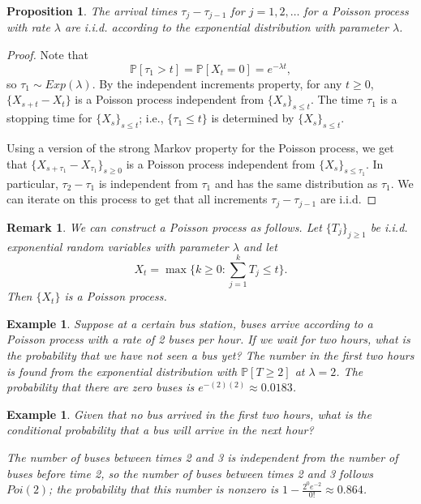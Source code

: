 \documentclass{tufte-handout}
\renewcommand*\P{\mathbb{P}}
\newtheorem{rmk}[thm]{Remark}
\newtheorem{ex}[thm]{Example}
\newtheorem{prop}[thm]{Proposition}
\theoremstyle{definition}
\begin{document}
\begin{prop}
	The arrival times $\tau_j - \tau_{j-1}$ for $j=1,2,\ldots$ for a Poisson process with rate $\lambda$ are i.i.d. according to the exponential distribution with parameter $\lambda$. 
\end{prop}
\begin{proof}
	Note that \[
		\P\left[\tau_1 > t\right] = \P\left[X_t = 0\right] = e^{-\lambda t}
	,\] so $\tau_1 \sim Exp(\lambda)$. By the independent increments property, for any $t \ge 0$, $\{X_{s+t} - X_t\}$ is a Poisson process independent from $\{X_s\}_{s\le t}$. The time $\tau_1$ is a stopping time for $\{X_s\}_{s\le t}$; i.e., $\{\tau_1 \le t\}$ is determined by $\{X_s\}_{s\le t}$.

	Using a version of the strong Markov property for the Poisson process, we get that $\{X_{s+\tau_1}-X_{\tau_1}\}_{s\ge 0}$ is a Poisson process independent from $\{X_s\}_{s \le \tau_1}$. In particular, $\tau_2-\tau_1$ is independent from $\tau_1$ and has the same distribution as $\tau_1$. We can iterate on this process to get that all increments $\tau_j - \tau_{j-1}$ are i.i.d.
\end{proof}

\begin{rmk}
	We can construct a Poisson process as follows. Let $\{T_j\}_{j\ge 1}$ be i.i.d. exponential random variables with parameter $\lambda$ and let \[
		X_t = \max \{k \ge 0 : \sum\limits_{j=1}^{k} T_j \le t\}
	.\] Then $\{X_t\}$ is a Poisson process.
\end{rmk}

\begin{ex}
	Suppose at a certain bus station, buses arrive according to a Poisson process with a rate of 2 buses per hour.
	If we wait for two hours, what is the probability that we have not seen a bus yet?
	 The number in the first two hours is found from the exponential distribution with $\P\left[T \ge 2\right]$ at $\lambda=2$. The probability that there are zero buses is $e^{-(2)(2)} \approx 0.0183$.
\end{ex}

\begin{ex}
	Given that no bus arrived in the first two hours, what is the conditional probability that a bus will arrive in the next hour?

	 The number of buses between times 2 and 3 is independent from the number of buses before time 2, so the number of buses between times 2 and 3 follows $Poi(2)$; the probability that this number is nonzero is $1- \frac{2^0 e^{-2}}{0!} \approx 0.864$.
\end{ex}
\end{document}
